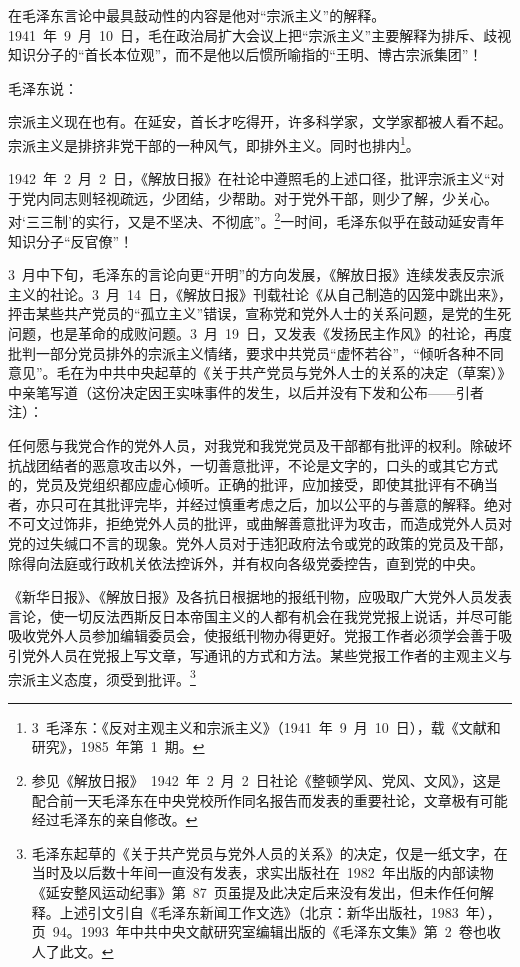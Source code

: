 在毛泽东言论中最具鼓动性的内容是他对“宗派主义”的解释。1941~年~9~月~10~日，毛在政治局扩大会议上把“宗派主义”主要解释为排斥、歧视知识分子的“首长本位观”，而不是他以后惯所喻指的“王明、博古宗派集团”！

毛泽东说：

\begin{quoting}
宗派主义现在也有。在延安，首长才吃得开，许多科学家，文学家都被人看不起。宗派主义是排挤非党干部的一种风气，即排外主义。同时也排内\footnote{3~毛泽东：《反对主观主义和宗派主义》（1941~年~9~月~10~日），载《文献和研究》，1985~年第~1~期。}。
\end{quoting}1942~年~2~月~2~日，《解放日报》在社论中遵照毛的上述口径，批评宗派主义“对于党内同志则轻视疏远，少团结，少帮助。对于党外干部，则少了解，少关心。对‘三三制’的实行，又是不坚决、不彻底”。\footnote{参见《解放日报》~1942~年~2~月~2~日社论《整顿学风、党风、文风》，这是配合前一天毛泽东在中央党校所作同名报告而发表的重要社论，文章极有可能经过毛泽东的亲自修改。}一时间，毛泽东似乎在鼓动延安青年知识分子“反官僚”！

3~月中下旬，毛泽东的言论向更“开明”的方向发展，《解放日报》连续发表反宗派主义的社论。3~月~14~日，《解放日报》刊载社论《从自己制造的囚笼中跳出来》，抨击某些共产党员的“孤立主义”错误，宣称党和党外人士的关系问题，是党的生死问题，也是革命的成败问题。3~月~19~日，又发表《发扬民主作风》的社论，再度批判一部分党员排外的宗派主义情绪，要求中共党员“虚怀若谷”，“倾听各种不同意见”。毛在为中共中央起草的《关于共产党员与党外人士的关系的决定（草案）》中亲笔写道（这份决定因王实味事件的发生，以后并没有下发和公布——引者注）：

\begin{quoting}
任何愿与我党合作的党外人员，对我党和我党党员及干部都有批评的权利。除破坏抗战团结者的恶意攻击以外，一切善意批评，不论是文字的，口头的或其它方式的，党员及党组织都应虚心倾听。正确的批评，应加接受，即使其批评有不确当者，亦只可在其批评完毕，并经过慎重考虑之后，加以公平的与善意的解释。绝对不可文过饰非，拒绝党外人员的批评，或曲解善意批评为攻击，而造成党外人员对党的过失缄口不言的现象。党外人员对于违犯政府法令或党的政策的党员及干部，除得向法庭或行政机关依法控诉外，并有权向各级党委控告，直到党的中央。

《新华日报》、《解放日报》及各抗日根据地的报纸刊物，应吸取广大党外人员发表言论，使一切反法西斯反日本帝国主义的人都有机会在我党党报上说话，并尽可能吸收党外人员参加编辑委员会，使报纸刊物办得更好。党报工作者必须学会善于吸引党外人员在党报上写文章，写通讯的方式和方法。某些党报工作者的主观主义与宗派主义态度，须受到批评。\footnote{毛泽东起草的《关于共产党员与党外人员的关系》的决定，仅是一纸文字，在当时及以后数十年间一直没有发表，求实出版社在~1982~年出版的内部读物《延安整风运动纪事》第~87~页虽提及此决定后来没有发出，但未作任何解释。上述引文引自《毛泽东新闻工作文选》（北京：新华出版社，1983~年），页~94。1993~年中共中央文献研究室编辑出版的《毛泽东文集》第~2~卷也收人了此文。}
\end{quoting}

